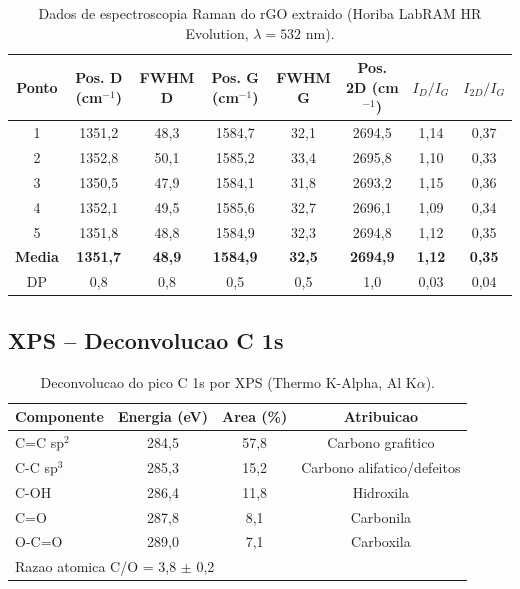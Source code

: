 \documentclass[11pt,a4paper]{article}
\begin{document}
\begin{table}[H]\centering
\caption{Dados de espectroscopia Raman do rGO extraido (Horiba LabRAM HR Evolution, $\lambda=532$ nm).}\label{tab:raman}
\begin{tabular}{cccccccc}
\toprule
{\bfseries Ponto} & {\bfseries Pos. D (cm$^{-1}$)} & {\bfseries FWHM D} & {\bfseries Pos. G (cm$^{-1}$)} & {\bfseries FWHM G} & {\bfseries Pos. 2D (cm$^{-1}$)} & {\bfseries $I_D/I_G$} & {\bfseries $I_{2D}/I_G$} \\
\midrule
1 & 1351,2 & 48,3 & 1584,7 & 32,1 & 2694,5 & 1,14 & 0,37 \\
2 & 1352,8 & 50,1 & 1585,2 & 33,4 & 2695,8 & 1,10 & 0,33 \\
3 & 1350,5 & 47,9 & 1584,1 & 31,8 & 2693,2 & 1,15 & 0,36 \\
4 & 1352,1 & 49,5 & 1585,6 & 32,7 & 2696,1 & 1,09 & 0,34 \\
5 & 1351,8 & 48,8 & 1584,9 & 32,3 & 2694,8 & 1,12 & 0,35 \\
\midrule
{\bfseries Media} & {\bfseries 1351,7} & {\bfseries 48,9} & {\bfseries 1584,9} & {\bfseries 32,5} & {\bfseries 2694,9} & {\bfseries 1,12} & {\bfseries 0,35} \\
DP & 0,8 & 0,8 & 0,5 & 0,5 & 1,0 & 0,03 & 0,04 \\
\bottomrule
\end{tabular}
\end{table}

\subsection{XPS -- Deconvolucao C 1s}

\begin{table}[H]\centering
\caption{Deconvolucao do pico C 1s por XPS (Thermo K-Alpha, Al K$\alpha$).}\label{tab:xps}
\begin{tabular}{lccc}
\toprule
{\bfseries Componente} & {\bfseries Energia (eV)} & {\bfseries Area (\%)} & {\bfseries Atribuicao} \\
\midrule
C=C sp$^2$ & 284,5 & 57,8 & Carbono grafitico \\
C-C sp$^3$ & 285,3 & 15,2 & Carbono alifatico/defeitos \\
C-OH & 286,4 & 11,8 & Hidroxila \\
C=O & 287,8 & 8,1 & Carbonila \\
O-C=O & 289,0 & 7,1 & Carboxila \\
\midrule
\multicolumn{3}{l}{Razao atomica C/O = 3,8 $\pm$ 0,2} \\
\bottomrule
\end{tabular}
\end{table}
\end{document}
